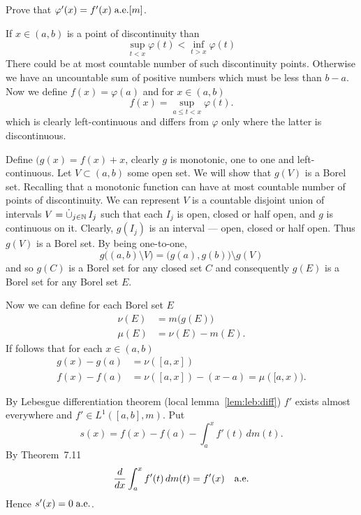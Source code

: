 \begin{enumerate}
\begin{excopy}
\begin{itemize}
Prove that \(\varphi'(x) = f'(x)\;\textrm{a.e.}[m]\).
\end{itemize}
\end{excopy}

\begin{itemize}
If \(x\in(a,b)\) is a point of discontinuity than
\begin{equation*}
\sup_{t<x} \varphi(t) < \inf_{t>x} \varphi(t) 
\end{equation*}
There could be at most countable number of such discontinuity points.
Otherwise we have an uncountable sum of positive numbers
which must be less than \(b-a\).
Now we define \(f(x) = \varphi(a)\) and for \(x\in(a,b)\)
\begin{equation} \label{eq:ex7.12e:f}
f(x) = \sup_{a\leq t < x} \varphi(t).
\end{equation}
which is clearly left-continuous and differs from \(\varphi\)
only where the latter is discontinuous.

Define \((g(x) = f(x) + x\), clearly $g$ is monotonic, one to one and 
left-continuous. Let \(V\subset (a,b)\) some open set.
We will show that \(g(V)\) is a Borel set.
Recalling that a monotonic function can have at most countable
number of points of discontinuity.
We can represent $V$ is a countable disjoint union of intervals
\(V = \disjunion_{j\in\N} I_j\) such that each \(I_j\)
is open, closed or half open, and $g$ is continuous on it.
Clearly, \(g(I_j)\) is an interval --- open, closed or half open.
Thus \(g(V)\) is a Borel set. By being one-to-one, 
\begin{equation*}
g\bigl((a,b)\setminus V\bigr) = \bigl(g(a),g(b)\bigr) \setminus g(V) 
\end{equation*}
and so \(g(C)\) is a Borel set for any closed set $C$
and consequently 
\(g(E)\) is a Borel set for any Borel set $E$.

Now we can define for each Borel set $E$
\begin{align*}
\nu(E) &= m\bigl(g(E)\bigr) \\
\mu(E) &= \nu(E) - m(E).
\end{align*}
If follows that for each \(x\in(a,b)\)
\begin{align*}
g(x) - g(a) &= \nu([a,x]) \\
f(x) - f(a) &= \nu([a,x]) - (x-a) = \mu([a,x)).
\end{align*}

By Lebesgue differentiation theorem (local lemma~\ref{lem:leb:diff})
\(f'\) exists almost everywhere and \(f'\in L^1([a,b],m)\). Put 
\begin{equation} \label{eq:ex7.12:sx}
s(x) = f(x) - f(a) - \int_a^x f'(t)\,dm(t).
\end{equation}
By Theorem~7.11 \cite{RudinPMA85} 
\begin{equation*}
\frac{d}{dx} \int_a^x f'(t)\,dm(t) = f'(x) \quad\textrm{a.e.}
\end{equation*}
Hence \(s'(x) = 0\; \textrm{a.e.}\).



\end{itemize}
\end{enumerate}
